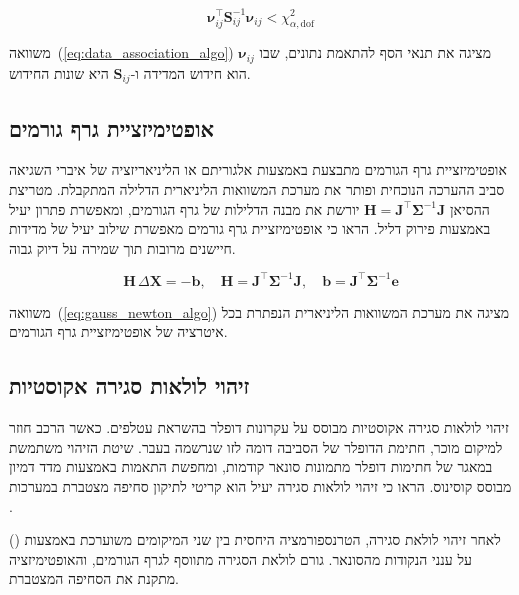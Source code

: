 \begin{equation}
\boldsymbol{\nu}_{ij}^\top \mathbf{S}_{ij}^{-1} \boldsymbol{\nu}_{ij} < \chi^2_{\alpha, \text{dof}}
\label{eq:data_association_algo}
\end{equation}

משוואה~(\ref{eq:data_association_algo}) מציגה את תנאי הסף להתאמת נתונים, שבו $\boldsymbol{\nu}_{ij}$ הוא חידוש המדידה ו-$\mathbf{S}_{ij}$ היא שונות החידוש.

\subsection{אופטימיזציית גרף גורמים}
\label{sec:factor_graph_optimization}

אופטימיזציית גרף הגורמים מתבצעת באמצעות אלגוריתם  או  הליניאריזציה של איברי השגיאה סביב ההערכה הנוכחית ופותר את מערכת המשוואות הליניארית הדלילה המתקבלת. מטריצת ההסיאן $\mathbf{H} = \mathbf{J}^\top \boldsymbol{\Sigma}^{-1} \mathbf{J}$ יורשת את מבנה הדלילות של גרף הגורמים, ומאפשרת פתרון יעיל באמצעות פירוק  דליל. \citet{Grisetti2010g2o} הראו כי אופטימיזציית גרף גורמים מאפשרת שילוב יעיל של מדידות חיישנים מרובות תוך שמירה על דיוק גבוה.

\begin{equation}
\mathbf{H} \, \Delta\mathbf{X} = -\mathbf{b}, \quad \mathbf{H} = \mathbf{J}^\top \boldsymbol{\Sigma}^{-1} \mathbf{J}, \quad \mathbf{b} = \mathbf{J}^\top \boldsymbol{\Sigma}^{-1} \mathbf{e}
\label{eq:gauss_newton_algo}
\end{equation}

משוואה~(\ref{eq:gauss_newton_algo}) מציגה את מערכת המשוואות הליניארית הנפתרת בכל איטרציה של אופטימיזציית גרף הגורמים.

\subsection{זיהוי לולאות סגירה אקוסטיות}
\label{sec:loop_closure_algo}

זיהוי לולאות סגירה אקוסטיות מבוסס על עקרונות דופלר בהשראת עטלפים. כאשר הרכב חוזר למיקום מוכר, חתימת הדופלר של הסביבה דומה לזו שנרשמה בעבר. שיטת הזיהוי משתמשת במאגר של חתימות דופלר מתמונות סונאר קודמות, ומחפשת התאמות באמצעות מדד דמיון מבוסס קוסינוס. \citet{Kaess2012} הראו כי זיהוי לולאות סגירה יעיל הוא קריטי לתיקון סחיפה מצטברת במערכות .

לאחר זיהוי לולאת סגירה, הטרנספורמציה היחסית בין שני המיקומים משוערכת באמצעות  () על ענני הנקודות מהסונאר. גורם לולאת הסגירה מתווסף לגרף הגורמים, והאופטימיזציה מתקנת את הסחיפה המצטברת.


